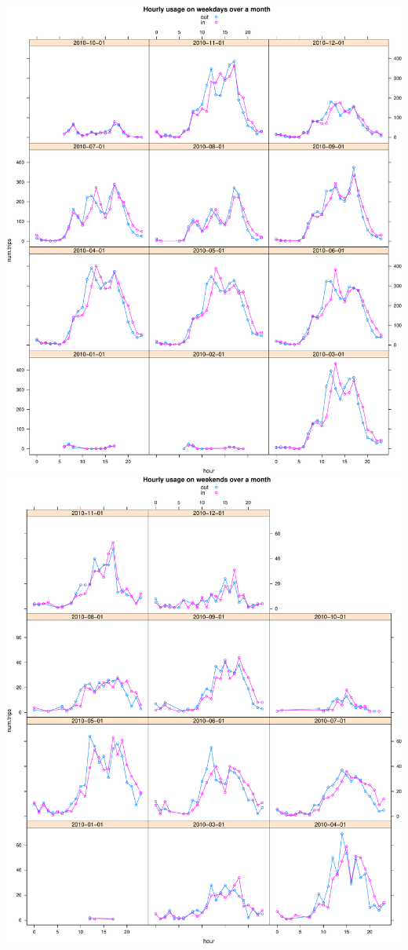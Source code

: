 \documentclass[]{article}
\begin{document}
\includegraphics{velopassBirdsEye_files/figure-latex/hourlyusagemonth-1.pdf}
\includegraphics{velopassBirdsEye_files/figure-latex/hourlyusagemonth-2.pdf}
\end{document}

